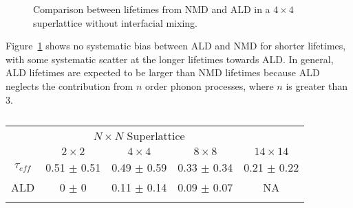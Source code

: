 \documentclass[aps,prb,preprint,preprintnumbers,amsmath,amssymb,floatfix,superscriptaddress]{revtex4}
\begin{document}
\begin{figure}%
\begin{center}
\renewcommand{\figure}{Fig.}
\caption{Comparison between lifetimes from NMD and ALD in a $4\times4$ superlattice without interfacial mixing.}
\label{FIG:NMD_v_ALD}
\end{center}
\end{figure}
Figure~\ref{FIG:NMD_v_ALD} shows no systematic bias between ALD and NMD for shorter lifetimes, with some systematic scatter at the longer lifetimes towards ALD. In general, ALD lifetimes are expected to be larger than NMD lifetimes because ALD neglects the contribution from $n$ order phonon processes\cite{PhysRevB.79.064301,esfarjani2011heat}, where $n$ is greater than 3.

\begin{table}
\begin{center}
\begin{tabular}{ccccc}
\hline\noalign{\smallskip}
&\multicolumn{3}{c}{$N\times N$ Superlattice} \\
\cline{2-5}\noalign{\smallskip}
\hspace{1cm} & $2\times2$ & $4\times4$ & $8\times8$ & $14\times14$  \\
\noalign{\smallskip}\hline\noalign{\smallskip}
$\tau_{eff}$   & 0.51 $\pm$ 0.51 & 0.49 $\pm$ 0.59 &  0.33 $\pm$ 0.34& 0.21 $\pm$ 0.22 \\
ALD   & 0 $\pm$ 0 & 0.11  $\pm$  0.14 &  0.09  $\pm$  0.07 & NA \\
\noalign{\smallskip}\hline
\end{tabular}
\end{center}
\renewcommand{\table}{Table.}
\caption{}
\label{TB:taud}
\end{table}
\end{document}
